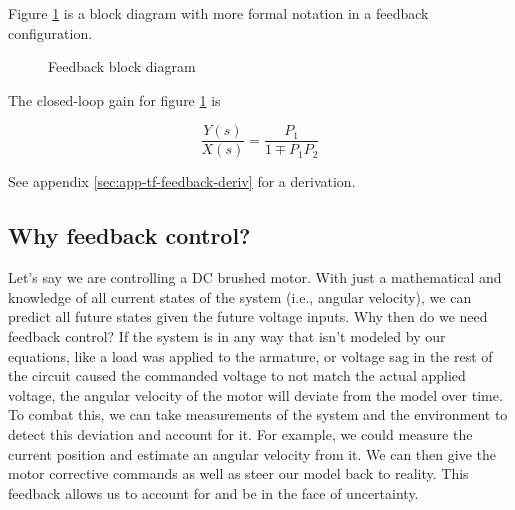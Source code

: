 Figure \ref{fig:feedback_loop} is a block diagram with more formal notation in a
feedback configuration.

\begin{figure}[H]
  \centering


  \caption{Feedback block diagram}
  \label{fig:feedback_loop}
\end{figure}

The closed-loop gain for figure \ref{fig:feedback_loop} is

\begin{equation}
  \frac{Y(s)}{X(s)} = \frac{P_1}{1 \mp P_1 P_2}
\end{equation}

See appendix \ref{sec:app-tf-feedback-deriv} for a derivation.

\subsection{Why feedback control?}

Let's say we are controlling a DC brushed motor. With just a mathematical
 and knowledge of all current \glspl{state}
of the \gls{system} (i.e., angular velocity), we can predict all future
\glspl{state} given the future voltage \glspl{input}. Why then do we need
feedback control? If the system is  in any way
that isn't modeled by our equations, like a load was applied to the armature, or
voltage sag in the rest of the circuit caused the commanded voltage to not match
the actual applied voltage, the angular velocity of the motor will deviate from
the \gls{model} over time. \\

To combat this, we can take measurements of the system and the environment to
detect this deviation and account for it. For example, we could measure the
current position and estimate an angular velocity from it. We can then give the
motor corrective commands as well as steer our \gls{model} back to reality. This
feedback allows us to account for and be  in the
face of uncertainty.
